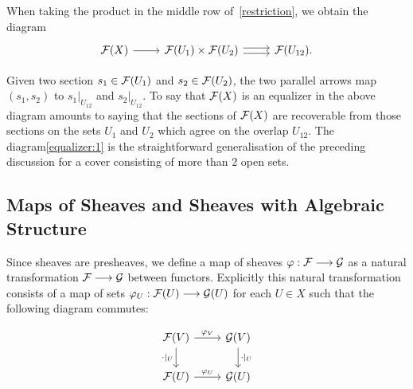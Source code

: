When taking the product in the middle row of~\ref{restriction}, we obtain the diagram 
\[
	\begin{tikzcd}
		{\Sh{F}(X)} & {\Sh{F}(U_1)\times\Sh{F}(U_2)} & {\Sh{F}(U_{12})}.
		\arrow[from=1-1, to=1-2]
		\arrow[shift right=1, from=1-2, to=1-3]
		\arrow[shift left=1, from=1-2, to=1-3]
	\end{tikzcd}
\]

Given two section $s_1 \in \mathcal{F}(U_1)$ and $s_2 \in \mathcal{F}(U_2)$, the two parallel arrows map $(s_1, s_2)$ to $s_1|_{U_{12}}$ and $s_2|_{U_{12}}$. To say that $\mathcal{F}(X)$ is an equalizer in the above diagram amounts to saying that the sections of $\mathcal{F}(X)$ are recoverable from those sections on the sets $U_1$ and $U_2$ which agree on the overlap $U_{12}$. The diagram\eqref{equalizer:1} is the straightforward generalisation of the preceding discussion for a cover consisting of more than 2 open sets.

\subsection{Maps of Sheaves and Sheaves with Algebraic Structure}
Since sheaves are presheaves, we define a map of sheaves $\varphi: \mathcal{F} \longrightarrow \mathcal{G}$ as a natural transformation $\mathcal{F} \longrightarrow \mathcal{G}$ between functors. Explicitly this natural transformation consists of a map of sets $\varphi_U: \mathcal{F}(U) \longrightarrow \mathcal{G}(U)$ for each $U \in X$ such that the following diagram commutes:

\[\begin{tikzcd}
	{\Sh{F}(V)} & {\Sh{G}(V)} \\
	{\Sh{F}(U)} & {\Sh{G}(U)}
	\arrow["{\cdot|_U}"', from=1-1, to=2-1]
	\arrow["{\varphi_V}", from=1-1, to=1-2]
	\arrow["{\cdot|_U}", from=1-2, to=2-2]
	\arrow["{\varphi_U}", from=2-1, to=2-2]
\end{tikzcd}\]

